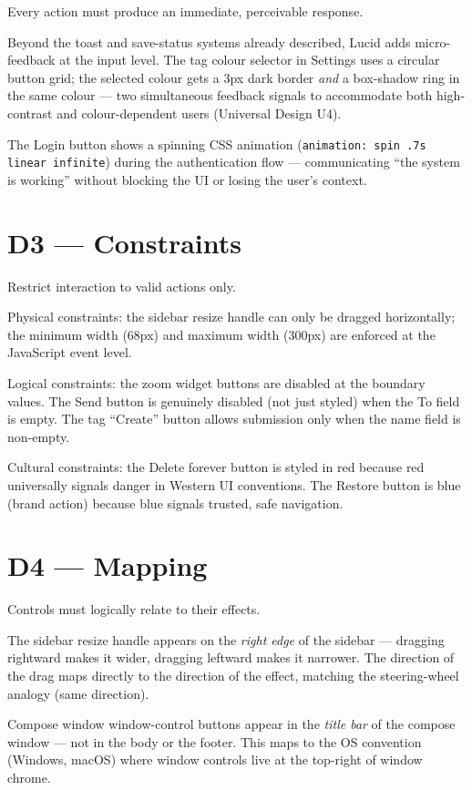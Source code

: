 \documentclass[12pt,a4paper]{report}
\begin{document}
Every action must produce an immediate, perceivable response.

Beyond the toast and save-status systems already described, Lucid adds micro-feedback at the
input level. The tag colour selector in Settings uses a circular button grid; the selected
colour gets a 3px dark border \textit{and} a box-shadow ring in the same colour — two
simultaneous feedback signals to accommodate both high-contrast and colour-dependent users
(Universal Design U4).

The Login button shows a spinning CSS animation (\texttt{animation: spin .7s linear infinite})
during the authentication flow — communicating ``the system is working'' without blocking
the UI or losing the user's context.

\section{D3 — Constraints}

Restrict interaction to valid actions only.

Physical constraints: the sidebar resize handle can only be dragged horizontally; the minimum
width (68px) and maximum width (300px) are enforced at the JavaScript event level.

Logical constraints: the zoom widget buttons are disabled at the boundary values. The Send
button is genuinely disabled (not just styled) when the To field is empty. The tag ``Create''
button allows submission only when the name field is non-empty.

Cultural constraints: the Delete forever button is styled in red because red universally
signals danger in Western UI conventions. The Restore button is blue (brand action) because
blue signals trusted, safe navigation.

\section{D4 — Mapping}

Controls must logically relate to their effects.

The sidebar resize handle appears on the \textit{right edge} of the sidebar — dragging
rightward makes it wider, dragging leftward makes it narrower. The direction of the drag maps
directly to the direction of the effect, matching the steering-wheel analogy (same direction).

Compose window window-control buttons appear in the \textit{title bar} of the compose window —
not in the body or the footer. This maps to the OS convention (Windows, macOS) where window
controls live at the top-right of window chrome.
\end{document}

